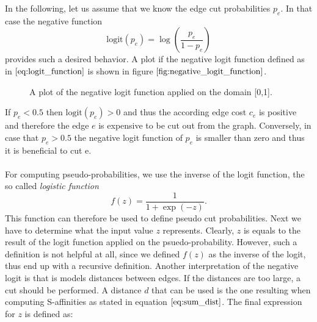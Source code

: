 In the following, let us assume that we know the edge cut probabilities $p_e$. In that case the negative function
\begin{equation}
	\text{logit}\left( p_e \right) = \log \left( \frac{p_e}{1 - p_e} \right)
	\label{eq:logit_function}
\end{equation}
provides such a desired behavior. A plot if the negative logit function defined as in $\ref{eq:logit_function}$ is shown in figure $\ref{fig:negative_logit_function}$.
\begin{figure}[H]
\centering
{}
\caption[Logit Function Plot]{A plot of the negative logit function applied on the domain [0,1].}
\label{fig:negative_logit_function}
\end{figure}
If $p_e < 0.5$ then $\text{logit}\left( p_e \right) > 0$ and thus the according edge cost $c_e$ is positive and therefore the edge $e$ is expensive to be cut out from the graph. Conversely, in case that $p_e > 0.5$ the negative logit function of $p_e$ is smaller than zero and thus it is beneficial to cut e. \\ \\
For computing pseudo-probabilities, we use the inverse of the logit function, the so called \textit{logistic function}
\begin{equation}
	f(z) = \frac{1}{1 + \exp \left( -z \right)}.
	\label{eq:logistic_function}
\end{equation}
This function can therefore be used to define pseudo cut probabilities. Next we have to determine what the input value $z$ represents. Clearly, $z$ is equals to the result of the logit function applied on the psuedo-probability. However, such a definition is not helpful at all, since we defined $f(z)$ as the inverse of the logit, thus end up with a recursive definition. Another interpretation of the negative logit is that is models distances between edges. If the distances are too large, a cut should be performed. A distance $d$ that can be used is the one resulting when computing S-affinities as stated in equation $\ref{eq:sum_dist}$. The final expression for $z$ is defined as:

